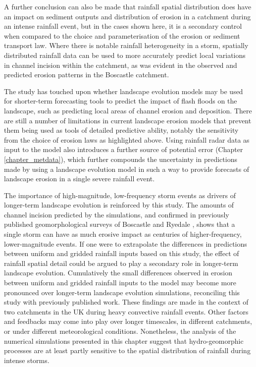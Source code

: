 A further conclusion can also be made that rainfall spatial distribution does have an impact on sediment outputs and distribution of erosion in a catchment during an intense rainfall event, but in the cases shown here, it is a secondary control when compared to the choice and parameterisation of the erosion or sediment transport law. Where there is notable rainfall heterogeneity in a storm, spatially distributed rainfall data can be used to more accurately predict local variations in channel incision within the catchment, as was evident in the observed and predicted erosion patterns in the Boscastle catchment.

The study has touched upon whether landscape evolution models may be used for shorter-term forecasting tools to predict the impact of flash floods on the landscape, such as predicting local areas of channel erosion and deposition. There are still a number of limitations in current landscape erosion models that prevent them being used as tools of detailed predictive ability, notably the sensitivity from the choice of erosion laws as highlighted above. Using rainfall radar data as input to the model also introduces a further source of potential error (Chapter \ref{chapter_metdata}), which further compounds the uncertainty in predictions made by using a landscape evolution model in such a way to provide forecasts of landscape erosion in a single severe rainfall event. 

The importance of high-magnitude, low-frequency storm events as drivers of longer-term landscape evolution is reinforced by this study. The amounts of channel incision predicted by the simulations, and confirmed in previously published geomorphological surveys of Boscastle \citep{wallingford2005flooding} and Ryedale \citep{dong2006evaluation,wass2008investigation}, shows that a single storm can have as much erosive impact as centuries of higher-frequency, lower-magnitude events. If one were to extrapolate the differences in predictions between uniform and gridded rainfall inputs based on this study, the effect of rainfall spatial detail could be argued to play a secondary role in longer-term landscape evolution. Cumulatively the small differences observed in erosion between uniform and gridded rainfall inputs to the model may become more pronounced over longer-term landscape evolution simulations, reconciling this study with previously published work. These findings are made in the context of two catchments in the UK during heavy convective rainfall events. Other factors and feedbacks may come into play over longer timescales, in different catchments, or under different meteorological conditions. Nonetheless, the analysis of the numerical simulations presented in this chapter suggest that hydro-geomorphic processes are at least partly sensitive to the spatial distribution of rainfall during intense storms.









